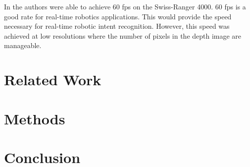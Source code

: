 \documentclass[conference]{IEEEtran}
\begin{document}
 

In \cite{Baak2011} the authors were able to achieve 60 fps on the Swiss-Ranger 4000. 60 fps is a good rate for real-time robotics applications. This would provide the speed necessary for real-time robotic intent recognition. However, this speed was achieved at low resolutions where the number of pixels in the depth image are manageable.

\section{Related Work}
\label{sec:relatedwork}

\section{Methods}
\label{sec:method}

\section{Conclusion}
\label{sec:clonclusion}




\end{document}
